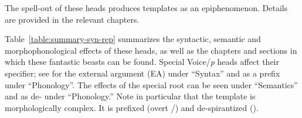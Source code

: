 \begin{exe}
\begin{xlist}
\begin{exe}
\begin{exe}
\begin{exe}
\begin{exe}
\begin{xlist}
\begin{exe}
\begin{xlist}
\begin{xlist}
\begin{xlist}
\begin{exe}
\begin{xlist}
\begin{exe}
\begin{exe}
\begin{xlist}
\begin{exe}
\begin{xlist}
\begin{exe}
\begin{exe}
\begin{xlist}
\begin{exe}
\begin{xlist}
\begin{exe}
\begin{xlist}
\begin{exe}
\begin{exe}
\begin{xlist}
\begin{exe}
\begin{exe}
\begin{xlist}
\begin{exe}
\begin{xlist}
\begin{exe}
\begin{xlist}
\begin{xlist}
\begin{exe}
\begin{exe}
\begin{xlist}
\begin{exe}
\begin{xlist}
\begin{exe}
\begin{xlist}
\begin{exe}
\begin{xlist}
\begin{exe}
\begin{exe}
\begin{exe}
\begin{exe}
\begin{exe}
\begin{xlist}
\begin{exe}
\begin{exe}
\begin{xlist}
The spell-out of these heads produces templates as an epiphenomenon. Details are provided in the relevant chapters.

Table~\ref{table:summary-syn-rep} summarizes the syntactic, semantic and morphophonological effects of these heads, as well as the chapters and sections in which these fantastic beasts can be found. Special Voice/\emph{p} heads affect their specifier; see for the external argument (EA) under ``Syntax'' and as a prefix under ``Phonology''. The effects of the special root {\va} can be seen under ``Semantics'' and as de- under ``Phonology.'' Note in particular that the {\thit} template is morphologically complex. It is prefixed (overt {\vz}/{\pz}) and de-spirantized ({\va}).

\begin{table}
\end{table}
\end{xlist}
\end{exe}
\end{exe}
\end{xlist}
\end{exe}
\end{exe}
\end{exe}
\end{exe}
\end{exe}
\end{xlist}
\end{exe}
\end{xlist}
\end{exe}
\end{xlist}
\end{exe}
\end{xlist}
\end{exe}
\end{exe}
\end{xlist}
\end{xlist}
\end{exe}
\end{xlist}
\end{exe}
\end{xlist}
\end{exe}
\end{exe}
\end{xlist}
\end{exe}
\end{exe}
\end{xlist}
\end{exe}
\end{xlist}
\end{exe}
\end{xlist}
\end{exe}
\end{exe}
\end{xlist}
\end{exe}
\end{xlist}
\end{exe}
\end{exe}
\end{xlist}
\end{exe}
\end{xlist}
\end{xlist}
\end{xlist}
\end{exe}
\end{xlist}
\end{exe}
\end{exe}
\end{exe}
\end{exe}
\end{xlist}
\end{exe}
